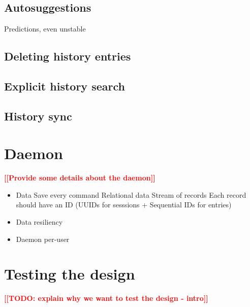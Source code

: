 \documentclass[thesis=M,english]{FITthesis}[2012/10/20]
\newcommand{\todotext}[1]{\textcolor{red}{\textbf{[[#1]]}}}
\begin{document}
\subsection{Autosuggestions}

Predictions, even unstable


\subsection{Deleting history entries}

\subsection{Explicit history search}

\subsection{History sync}



\section{Daemon}

\todotext{Provide some details about the daemon}

\begin{itemize}
    \item Data
    \subitem Save every command
    \subitem Relational data
    \subitem Stream of records
    \subitem Each record should have an ID (UUIDs for sesssions + Sequential IDs for entries)
    
    \item Data resiliency
    
    \item Daemon per-user
    
\end{itemize}





\section{Testing the design}


\todotext{TODO: explain why we want to test the design - intro}
\end{document}
